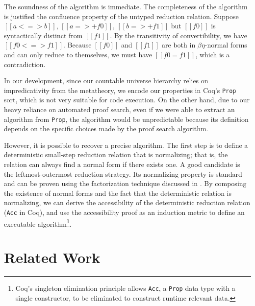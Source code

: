 \documentclass[acmsmall,screen=true,
\ifpublic review=false\else,review=true\fi
  ,anonymous=\ifanonymous true\else false\fi]{acmart}
\newcommand{\scw}[1]{}
\newcommand{\yl}[1]{}
\begin{document}
The soundness of the algorithm is immediate. The completeness of the
algorithm is justified the confluence property of the untyped
reduction relation. Suppose $[[a <=> b]]$, $[[a =>+ f0]]$, $[[b =>+
f1]]$ but $[[f0]]$ is syntactically distinct from $[[f1]]$. By the transitivity of convertibility, we have $[[f0 <=> f1]]$.
Because $[[f0]]$ and $[[f1]]$ are both in
$\beta\eta$-normal forms and can only reduce to themselves, we must
have $[[f0 = f1]]$, which is a contradiction.

In our development, since our countable universe hierarchy
relies on impredicativity from the metatheory, we encode our
properties in Coq's \texttt{Prop} sort, which is not very suitable for
code execution. On the other hand, due to our heavy reliance on
automated proof search, even if we were able to extract an algorithm from \texttt{Prop},
the algorithm would be unpredictable because its definition depends on
the specific choices made by the proof search algorithm.

However, %
it is possible to recover a
precise algorithm. The first step is to define a deterministic
small-step reduction relation that is normalizing; that is, the
relation can always find a normal form if there exists one. A good
candidate is the leftmost-outermost reduction strategy. Its
normalizing property is standard and can be proven using the
factorization technique discussed in
\citet{takahashi-parallel-reduction, factorization-essentially}. By
composing the existence of normal forms and the fact that the
deterministic relation is normalizing, we can derive the
accessibility of the deterministic reduction relation
(\texttt{Acc} in Coq), and use the accessibility proof as
an induction metric to define an executable algorithm\footnote{Coq's
  singleton elimination principle allows \texttt{Acc}, a
  \texttt{Prop} data type with a single constructor, to be eliminated
  to construct runtime relevant data.}.

\section{Related Work}
\label{sec:relatedwork}


\end{document}
